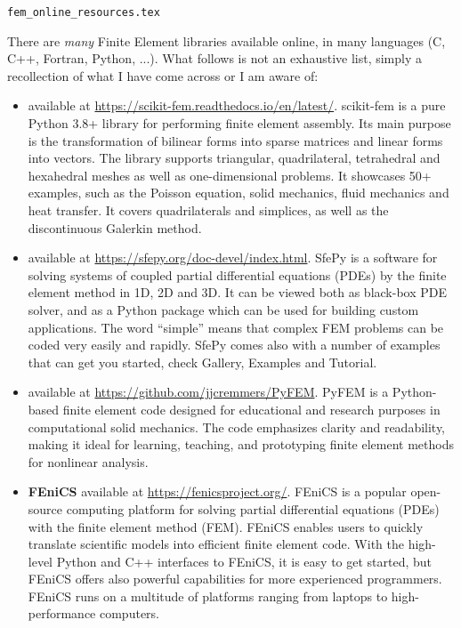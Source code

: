 \begin{flushright} {\tiny {\color{gray} \tt fem\_online\_resources.tex}} \end{flushright}

There are {\it many} Finite Element libraries available online, in 
many languages (C, C++, Fortran, Python, ...).
What follows is not an exhaustive list, simply a recollection 
of what I have come across or I am aware of:

\begin{itemize}
\item {} available at \url{https://scikit-fem.readthedocs.io/en/latest/}.
scikit-fem is a pure Python 3.8+ library for performing finite element assembly. Its main purpose is the transformation of bilinear forms into sparse matrices and linear forms into vectors. The library supports triangular, quadrilateral, tetrahedral and hexahedral meshes as well as one-dimensional problems.
It showcases 50+ examples, such as the Poisson equation, solid mechanics, fluid mechanics and heat transfer.
It covers quadrilaterals and simplices, as well as the discontinuous Galerkin method.

\item {} available at \url{https://sfepy.org/doc-devel/index.html}.
SfePy is a software for solving systems of coupled partial differential equations (PDEs) by the finite element method in 1D, 2D and 3D. It can be viewed both as black-box PDE solver, and as a Python package which can be used for building custom applications. The word “simple” means that complex FEM problems can be coded very easily and rapidly.
SfePy comes also with a number of examples that can get you started, check Gallery, Examples and Tutorial. 


\item {} available at \url{https://github.com/jjcremmers/PyFEM}.
PyFEM is a Python-based finite element code designed for educational and research purposes in computational solid mechanics. The code emphasizes clarity and readability, making it ideal for learning, teaching, and prototyping finite element methods for nonlinear analysis.

\item {\bf FEniCS} available at \url{https://fenicsproject.org/}.
FEniCS is a popular open-source computing platform for solving partial differential equations (PDEs) with the finite element method (FEM). FEniCS enables users to quickly translate scientific models into efficient finite element code. With the high-level Python and C++ interfaces to FEniCS, it is easy to get started, but FEniCS offers also powerful capabilities for more experienced programmers. FEniCS runs on a multitude of platforms ranging from laptops to high-performance computers.


\end{itemize}
